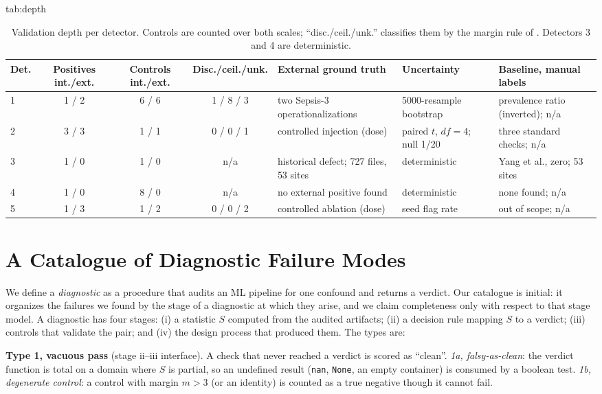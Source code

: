 \documentclass[pmlr,twocolumn,10pt]{jmlr}
\begin{document}
\begin{table}[t]
\floatconts
  {tab:depth}
  {\caption{Validation depth per detector. Controls are counted over both scales;
   ``disc./ceil./unk.'' classifies them by the margin rule of
   . Detectors 3 and 4 are deterministic.}}
  {\footnotesize\setlength{\tabcolsep}{3pt}%
  \begin{tabular}{@{}lcccp{2.5cm}p{2.1cm}p{2.0cm}@{}}
  \toprule
  \bfseries Det. & \bfseries Positives int./ext. & \bfseries Controls int./ext. &
    \bfseries Disc./ceil./unk. & \bfseries External ground truth &
    \bfseries Uncertainty & \bfseries Baseline, manual labels\\
  \midrule
  1 & 1 / 2 & 6 / 6 & 1 / 8 / 3 & two Sepsis-3 operationalizations & 5000-resample bootstrap & prevalence ratio (inverted); n/a\\
  2 & 3 / 3 & 1 / 1 & 0 / 0 / 1 & controlled injection (dose) & paired $t$, $df=4$; null 1/20 & three standard checks; n/a\\
  3 & 1 / 0 & 1 / 0 & n/a & historical defect; 727 files, 53 sites & deterministic & Yang et al., zero; 53 sites\\
  4 & 1 / 0 & 8 / 0 & n/a & no external positive found & deterministic & none found; n/a\\
  5 & 1 / 3 & 1 / 2 & 0 / 0 / 2 & controlled ablation (dose) & seed flag rate & out of scope; n/a\\
  \bottomrule
  \end{tabular}}
\end{table}

\section{A Catalogue of Diagnostic Failure Modes}
\label{sec:taxonomy}

We define a \emph{diagnostic} as a procedure that audits an ML pipeline for one
confound and returns a verdict. Our catalogue is initial: it organizes the
failures we found by the stage of a diagnostic at which they arise, and we claim
completeness only with respect to that stage model. A diagnostic has four
stages: (i) a statistic $S$ computed from the audited artifacts; (ii) a decision
rule mapping $S$ to a verdict; (iii) controls that validate the pair; and (iv)
the design process that produced them. The types are:

\textbf{Type 1, vacuous pass} (stage ii--iii interface). A check that never
reached a verdict is scored as ``clean''. \emph{1a, falsy-as-clean}: the verdict
function is total on a domain where $S$ is partial, so an undefined result
(\texttt{nan}, \texttt{None}, an empty container) is consumed by a boolean test.
\emph{1b, degenerate control}: a control with margin $m>3$ (or an identity) is
counted as a true negative though it cannot fail.
\end{document}
